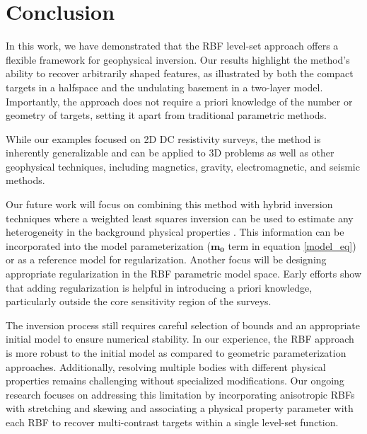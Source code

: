 \documentclass{segabs}
\begin{document}
\vspace{-0.45cm}
\section{Conclusion}
\vspace{-0.25cm}

In this work, we have demonstrated that the RBF level-set approach offers a flexible framework for geophysical inversion. Our results highlight the method’s ability to recover arbitrarily shaped features, as illustrated by both the compact targets in a halfspace and the undulating basement in a two-layer model. Importantly, the approach does not require a priori knowledge of the number or geometry of targets, setting it apart from traditional parametric methods.

While our examples focused on 2D DC resistivity surveys, the method is inherently generalizable and can be applied to 3D problems as well as other geophysical techniques, including magnetics, gravity, electromagnetic, and seismic methods.

Our future work will focus on combining this method with hybrid inversion techniques where a weighted least squares inversion can be used to estimate any heterogeneity in the background physical properties \citep{belliveau_parametric_2023}. This information can be incorporated into the model parameterization ($\mathbf{m_0}$ term in equation \ref{model_eq}) or as a reference model for regularization. Another focus will be designing appropriate regularization in the RBF parametric model space. Early efforts show that adding regularization is helpful in introducing a priori knowledge, particularly outside the core sensitivity region of the surveys.

The inversion process still requires careful selection of bounds and an appropriate initial model to ensure numerical stability. In our experience, the RBF approach is more robust to the initial model as compared to geometric parameterization approaches. Additionally, resolving multiple bodies with different physical properties remains challenging without specialized modifications. Our ongoing research focuses on addressing this limitation by incorporating anisotropic RBFs with stretching and skewing \citep{ozsar_parametric_2025} and associating a physical property parameter with each RBF to recover multi-contrast targets within a single level-set function.

\onecolumn


\end{document}
